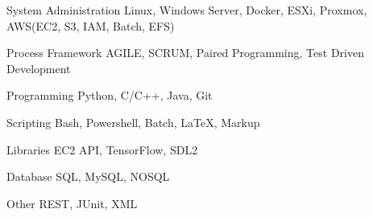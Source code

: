 
\begin{cvskills}

  \cvskill
    {System Administration} %
    {Linux, Windows Server, Docker, ESXi, Proxmox, AWS(EC2, S3, IAM, Batch, EFS)} %

  \cvskill
    {Process Framework} %
    {AGILE, SCRUM, Paired Programming, Test Driven Development} %

  \cvskill
    {Programming} %
    {Python, C/C++, Java, Git} %

  \cvskill
    {Scripting} %
    {Bash, Powershell, Batch, LaTeX, Markup} %

  \cvskill
    {Libraries} %
    {EC2 API, TensorFlow, SDL2} %
    
  \cvskill
    {Database} %
    {SQL, MySQL, NOSQL} %
    
  \cvskill
    {Other} %
    {REST, JUnit, XML} %
    
\end{cvskills}

